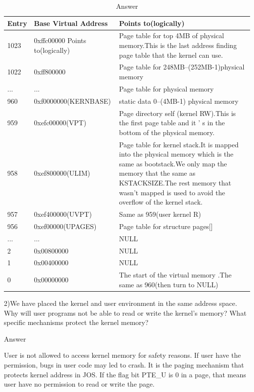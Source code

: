\begin{table}[H]
\centering
\begin{tabular}{ |p{150pt}<{\centering}|p{150pt}<{\centering}|p{150pt}<{\centering}| }
\hline				
Entry & Base Virtual Address &Points to(logically) \\ \hline 	
1023 & 0xffc00000 Points to(logically) & Page table for top 4MB of physical memory.This is the last address finding page table that the kernel can use.\\ \hline
1022 & 0xff800000 &Page table for 248MB--(252MB-1)physical memory \\ \hline 	
... & ... &Page table for physical memory \\ \hline
960 & 0xf0000000(KERNBASE) &static data 0--(4MB-1) physical memory \\ \hline
959 & 0xefc00000(VPT) &Page directory self (kernel RW).This is the first page table and it ’ s in the bottom of the physical memory. \\ \hline
958 & 0xef800000(ULIM) &Page table for kernel stack.It is mapped into the physical memory which is the same as bootstack.We only map the memory that the same as KSTACKSIZE.The rest memory that wasn’t mapped is used to avoid the overflow of the kernel stack. \\ \hline
957 & 0xef400000(UVPT) &Same as 959(user kernel R) \\ \hline
956 & 0xef00000(UPAGES) &Page table for structure pages[] \\ \hline
... & ... & NULL \\ \hline
2 & 0x00800000 & NULL \\ \hline
1 & 0x00400000 & NULL \\ \hline
0 & 0x00000000 & The start of the virtual memory .The same as 960(then turn to NULL)\\ \hline
\end{tabular}
\caption{Answer}
\end{table}

\begin{flushleft}
2)We have placed the kernel and user environment in the same address space. Why will user programs not be able to read or write the kernel's memory? What specific mechanisms protect the kernel memory?

{\Large Answer}
\end{flushleft}

User is not allowed to access kernel memory for safety reasons.
If user have the permission, bugs in user code may led to crash.
It is the paging mechanism that protects kernel address in JOS. If the flag bit PTE\_U is 0 in a page, that means user have no permission to read or write the page.

